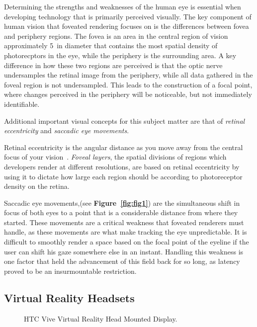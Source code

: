 \documentclass{sig-alternate}
\begin{document}
Determining the strengths and weaknesses of the human eye is essential when developing technology that is primarily perceived visually. The key component of human vision that foveated rendering focuses on is the differences between fovea and periphery regions. The fovea is an area in the central region of vision approximately 5\degree~in diameter that contains the most spatial density of photorecptors in the eye, while the periphery is the surrounding area. A key difference in how these two regions are perceived is that the optic nerve undersamples the retinal image from the periphery, while all data gathered in the foveal region is not undersampled. This leads to the construction of a focal point, where changes perceived in the periphery will be noticeable, but not immediately identifiable.\cite{Guenter:Foveated, Thibos:Image}


Additional important visual concepts for this subject matter are that of \textit{retinal eccentricity} and \textit{saccadic eye movements}. 

Retinal eccentricity is the angular distance as you move away from the central focus of your vision~\cite{Guenter:Foveated}. \textit{Foveal layers}, the spatial divisions of regions which developers render at different resolutions, are based on retinal eccentricity by using it to dictate how large each region should be according to photoreceptor density on the retina.

Saccadic eye movements,(see \textbf{Figure~\ref{fig:fig1}}) are the simultaneous shift in focus of both eyes to a point that is a considerable distance from where they started. These movements are a critical weakness that foveated renderers must handle, as these movements are what make tracking the eye unpredictable. It is difficult to smoothly render a space based on the focal point of the eyeline if the user can shift his gaze somewhere else in an instant. Handling this weakness is one factor that held the advancement of this field back for so long, as latency proved to be an insurmountable restriction.
\subsection{Virtual Reality Headsets}
\label{sec:VRHMDs}

\begin{figure}
\centering
{}
\caption{HTC Vive Virtual Reality Head Mounted Display.~\cite{Tom:derek}}
\label{fig:fig2}
\end{figure}
\end{document}

